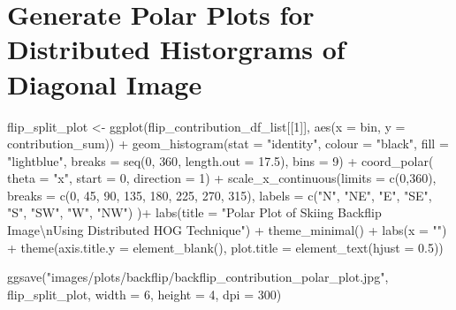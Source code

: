 \documentclass[
  letterpaper,
  DIV=11,
  numbers=noendperiod]{scrreprt}
\newenvironment{Shaded}{\begin{snugshade}}{\end{snugshade}}
\newcommand{\AttributeTok}[1]{\textcolor[rgb]{0.40,0.45,0.13}{#1}}
\newcommand{\DecValTok}[1]{\textcolor[rgb]{0.68,0.00,0.00}{#1}}
\newcommand{\FloatTok}[1]{\textcolor[rgb]{0.68,0.00,0.00}{#1}}
\newcommand{\FunctionTok}[1]{\textcolor[rgb]{0.28,0.35,0.67}{#1}}
\newcommand{\NormalTok}[1]{\textcolor[rgb]{0.00,0.23,0.31}{#1}}
\newcommand{\OtherTok}[1]{\textcolor[rgb]{0.00,0.23,0.31}{#1}}
\newcommand{\SpecialCharTok}[1]{\textcolor[rgb]{0.37,0.37,0.37}{#1}}
\newcommand{\StringTok}[1]{\textcolor[rgb]{0.13,0.47,0.30}{#1}}
\begin{document}
\section{Generate Polar Plots for Distributed Historgrams of Diagonal
Image}\label{generate-polar-plots-for-distributed-historgrams-of-diagonal-image}

\begin{Shaded}
\begin{Highlighting}[]
\NormalTok{flip\_split\_plot }\OtherTok{\textless{}{-}}
  \FunctionTok{ggplot}\NormalTok{(flip\_contribution\_df\_list[[}\DecValTok{1}\NormalTok{]],}
         \FunctionTok{aes}\NormalTok{(}\AttributeTok{x =}\NormalTok{ bin, }\AttributeTok{y =}\NormalTok{ contribution\_sum)) }\SpecialCharTok{+}
  \FunctionTok{geom\_histogram}\NormalTok{(}\AttributeTok{stat =} \StringTok{"identity"}\NormalTok{,}
                 \AttributeTok{colour =} \StringTok{"black"}\NormalTok{,}
                 \AttributeTok{fill =} \StringTok{"lightblue"}\NormalTok{,}
                 \AttributeTok{breaks =} \FunctionTok{seq}\NormalTok{(}\DecValTok{0}\NormalTok{, }\DecValTok{360}\NormalTok{, }\AttributeTok{length.out =} \FloatTok{17.5}\NormalTok{),}
                 \AttributeTok{bins =} \DecValTok{9}\NormalTok{) }\SpecialCharTok{+}
  \FunctionTok{coord\_polar}\NormalTok{(}
    \AttributeTok{theta =} \StringTok{"x"}\NormalTok{,}
    \AttributeTok{start =} \DecValTok{0}\NormalTok{,}
    \AttributeTok{direction =} \DecValTok{1}\NormalTok{) }\SpecialCharTok{+}
  \FunctionTok{scale\_x\_continuous}\NormalTok{(}\AttributeTok{limits =} \FunctionTok{c}\NormalTok{(}\DecValTok{0}\NormalTok{,}\DecValTok{360}\NormalTok{),}
    \AttributeTok{breaks =} \FunctionTok{c}\NormalTok{(}\DecValTok{0}\NormalTok{, }\DecValTok{45}\NormalTok{, }\DecValTok{90}\NormalTok{, }\DecValTok{135}\NormalTok{, }\DecValTok{180}\NormalTok{, }\DecValTok{225}\NormalTok{, }\DecValTok{270}\NormalTok{, }\DecValTok{315}\NormalTok{),}
    \AttributeTok{labels =} \FunctionTok{c}\NormalTok{(}\StringTok{"N"}\NormalTok{, }\StringTok{"NE"}\NormalTok{, }\StringTok{"E"}\NormalTok{, }\StringTok{"SE"}\NormalTok{, }\StringTok{"S"}\NormalTok{, }\StringTok{"SW"}\NormalTok{, }\StringTok{"W"}\NormalTok{, }\StringTok{"NW"}\NormalTok{)}
\NormalTok{  )}\SpecialCharTok{+}
  \FunctionTok{labs}\NormalTok{(}\AttributeTok{title =} \StringTok{"Polar Plot of Skiing Backflip Image}\SpecialCharTok{\textbackslash{}n}\StringTok{Using Distributed HOG Technique"}\NormalTok{) }\SpecialCharTok{+}
  \FunctionTok{theme\_minimal}\NormalTok{() }\SpecialCharTok{+}
  \FunctionTok{labs}\NormalTok{(}\AttributeTok{x =} \StringTok{""}\NormalTok{) }\SpecialCharTok{+}
  \FunctionTok{theme}\NormalTok{(}\AttributeTok{axis.title.y =} \FunctionTok{element\_blank}\NormalTok{(),}
        \AttributeTok{plot.title =} \FunctionTok{element\_text}\NormalTok{(}\AttributeTok{hjust =} \FloatTok{0.5}\NormalTok{))}

\FunctionTok{ggsave}\NormalTok{(}\StringTok{"images/plots/backflip/backflip\_contribution\_polar\_plot.jpg"}\NormalTok{, flip\_split\_plot, }\AttributeTok{width =} \DecValTok{6}\NormalTok{, }\AttributeTok{height =} \DecValTok{4}\NormalTok{, }\AttributeTok{dpi =} \DecValTok{300}\NormalTok{)}
\end{Highlighting}
\end{Shaded}
\end{document}
